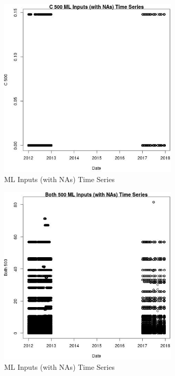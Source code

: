 \begin{figure} 
\centering  
\includegraphics[width=0.77\textwidth]{Code_Outputs/Report_ML_input_PM25_Step4_part_e_de_duplicated_aves_compiled_2019-05-14wNAs_C_500vDate.jpg} 
\caption{\label{fig:Report_ML_input_PM25_Step4_part_e_de_duplicated_aves_compiled_2019-05-14wNAsC_500vDate}ML Inputs (with NAs) Time Series} 
\end{figure} 
 

\clearpage 

\begin{figure} 
\centering  
\includegraphics[width=0.77\textwidth]{Code_Outputs/Report_ML_input_PM25_Step4_part_e_de_duplicated_aves_compiled_2019-05-14wNAs_Both_500vDate.jpg} 
\caption{\label{fig:Report_ML_input_PM25_Step4_part_e_de_duplicated_aves_compiled_2019-05-14wNAsBoth_500vDate}ML Inputs (with NAs) Time Series} 
\end{figure} 
 

